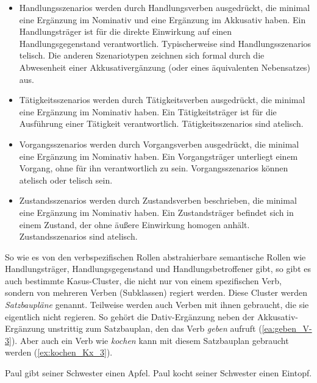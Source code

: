 \begin{itemize}

    \item Handlungsszenarios werden durch Handlungsverben ausgedrückt, die minimal eine Ergänzung im Nominativ und eine Ergänzung im Akkusativ haben. Ein Handlungsträger ist für die direkte Einwirkung auf einen Handlungsgegenstand verantwortlich. Typischerweise sind Handlungsszenarios telisch. Die anderen Szenariotypen zeichnen sich formal durch die Abwesenheit einer Akkusativergänzung (oder eines äquivalenten Nebensatzes) aus. 

    \item Tätigkeitsszenarios werden durch Tätigkeitsverben ausgedrückt, die minimal eine Ergänzung im Nominativ haben. Ein Tätigkeitsträger ist für die Ausführung einer Tätigkeit verantwortlich. Tätigkeitsszenarios sind atelisch. 

    \item Vorgangsszenarios werden durch Vorgangsverben ausgedrückt, die minimal eine Ergänzung im Nominativ haben. Ein Vorgangsträger unterliegt einem Vorgang, ohne für ihn verantwortlich zu sein. Vorgangsszenarios können atelisch oder telisch sein. 

    \item Zustandsszenarios werden durch Zustandsverben beschrieben, die minimal eine Ergänzung im Nominativ haben. Ein Zustandsträger befindet sich in einem Zustand, der ohne äußere Einwirkung homogen anhält. Zustandsszenarios sind atelisch. 

\end{itemize}


So wie es von den verbspezifischen Rollen abstrahierbare semantische Rollen wie Handlungsträger, Handlungsgegenstand und Handlungsbetroffener gibt, so gibt es auch bestimmte Kasus-Cluster, die nicht nur von einem spezifischen Verb, sondern von mehreren Verben (Subklassen) regiert werden. Diese Cluster werden \textit{Satzbaupläne} genannt. Teilweise werden auch Verben mit ihnen gebraucht, die sie eigentlich nicht regieren. So gehört die Dativ-Ergänzung neben der Akkusativ-Ergänzung unstrittig zum Satzbauplan, den das Verb \textit{geben} aufruft (\ref{ea:geben_V-3}). Aber auch ein Verb wie \textit{kochen} kann mit diesem Satzbauplan gebraucht werden (\ref{ex:kochen_Kx_3}).

\ea \label{ea:Satzbauplan_V_Kx}
\ea \label{ea:geben_V-3} Paul gibt seiner Schwester einen Apfel.
\ex \label{ex:kochen_Kx_3} Paul kocht seiner Schwester einen Eintopf.
\z 
\z 
 
